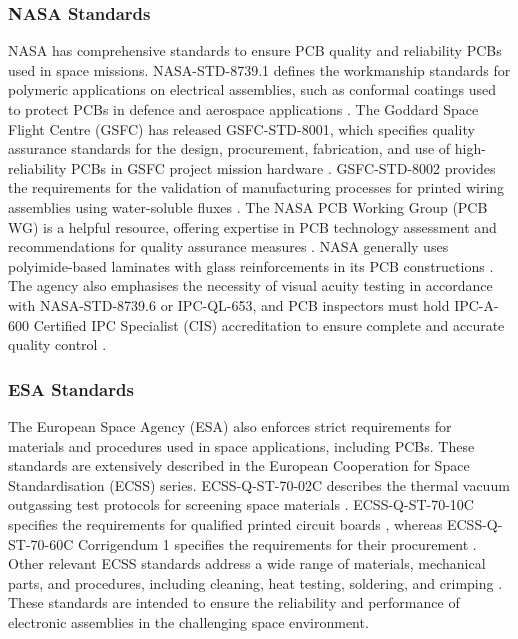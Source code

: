 \subsubsection{NASA Standards}
NASA has comprehensive standards to ensure PCB quality and reliability PCBs used in space missions. 
NASA-STD-8739.1 defines the workmanship standards for polymeric applications on electrical assemblies, such as conformal coatings used to protect PCBs in defence and aerospace applications \cite{SCSCoatingSystems2021}. 
The Goddard Space Flight Centre (GSFC) has released GSFC-STD-8001, which specifies quality assurance standards for the design, procurement, fabrication, and use of high-reliability PCBs in GSFC project mission hardware \cite{GoddardSpaceFlightCentre2019}. 
GSFC-STD-8002 provides the requirements for the validation of manufacturing processes for printed wiring assemblies using water-soluble fluxes \cite{GoddardSpaceFlightCentre2015}. 
The NASA PCB Working Group (PCB WG) is a helpful resource, offering expertise in PCB technology assessment and recommendations for quality assurance measures \cite{CadenceDesignSystems2025}. 
NASA generally uses polyimide-based laminates with glass reinforcements in its PCB constructions \cite{CadenceDesignSystems2025}. 
The agency also emphasises the necessity of visual acuity testing in accordance with NASA-STD-8739.6 or IPC-QL-653, and PCB inspectors must hold IPC-A-600 Certified IPC Specialist (CIS) accreditation to ensure complete and accurate quality control \cite{GoddardSpaceFlightCentre2019}.
\subsubsection{ESA Standards}
The European Space Agency (ESA) also enforces strict requirements for materials and procedures used in space applications, including PCBs. 
These standards are extensively described in the European Cooperation for Space Standardisation (ECSS) series. 
ECSS-Q-ST-70-02C describes the thermal vacuum outgassing test protocols for screening space materials \cite{Leverett2024}. 
ECSS-Q-ST-70-10C specifies the requirements for qualified printed circuit boards \cite{ECSS2008}, whereas ECSS-Q-ST-70-60C Corrigendum 1 specifies the requirements for their procurement \cite{ECSS2019}. 
Other relevant ECSS standards address a wide range of materials, mechanical parts, and procedures, including cleaning, heat testing, soldering, and crimping \cite{ECSS2019}. 
These standards are intended to ensure the reliability and performance of electronic assemblies in the challenging space environment.


